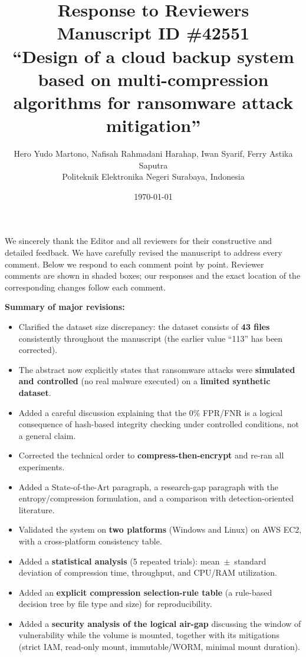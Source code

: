 \documentclass[11pt,a4paper]{article}
\title{\textbf{Response to Reviewers}\\[4pt]
\large Manuscript ID \#42551\\
\normalsize ``Design of a cloud backup system based on multi-compression algorithms
for ransomware attack mitigation''}
\author{Hero Yudo Martono, Nafisah Rahmadani Harahap, Iwan Syarif, Ferry Astika Saputra\\
\small Politeknik Elektronika Negeri Surabaya, Indonesia}
\date{\today}
\begin{document}
\maketitle

\noindent We sincerely thank the Editor and all reviewers for their constructive and
detailed feedback. We have carefully revised the manuscript to address every comment.
Below we respond to each comment point by point. Reviewer comments are shown in shaded
boxes; our responses and the exact location of the corresponding changes follow each comment.

\medskip
\noindent\textbf{Summary of major revisions:}
\begin{itemize}[leftmargin=1.4em, itemsep=1pt]
  \item Clarified the dataset size discrepancy: the dataset consists of \textbf{43 files}
        consistently throughout the manuscript (the earlier value ``113'' has been corrected).
  \item The abstract now explicitly states that ransomware attacks were \textbf{simulated and
        controlled} (no real malware executed) on a \textbf{limited synthetic dataset}.
  \item Added a careful discussion explaining that the 0\% FPR/FNR is a logical consequence
        of hash-based integrity checking under controlled conditions, not a general claim.
  \item Corrected the technical order to \textbf{compress-then-encrypt} and re-ran all experiments.
  \item Added a State-of-the-Art paragraph, a research-gap paragraph with the entropy/compression
        formulation, and a comparison with detection-oriented literature.
  \item Validated the system on \textbf{two platforms} (Windows and Linux) on AWS EC2, with a
        cross-platform consistency table.
  \item Added a \textbf{statistical analysis} (5 repeated trials): mean~$\pm$~standard deviation of
        compression time, throughput, and CPU/RAM utilization.
  \item Added an \textbf{explicit compression selection-rule table} (a rule-based decision tree by
        file type and size) for reproducibility.
  \item Added a \textbf{security analysis of the logical air-gap} discussing the window of
        vulnerability while the volume is mounted, together with its mitigations (strict IAM,
        read-only mount, immutable/WORM, minimal mount duration).

\end{itemize}
\end{document}
